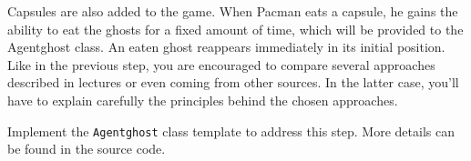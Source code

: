 \documentclass[12pt,a4paper,BCOR12mm, headexclude, footexclude, twoside, openright]{scrartcl}
\numberwithin{equation}{section} %
\numberwithin{figure}{section} %
\numberwithin{table}{section} %
\begin{document}
Capsules are also added to the game. When Pacman eats a capsule, he gains the ability to eat the ghosts for a fixed amount of time, which will be provided to the Agentghost class. An eaten ghost reappears immediately in its initial position.\\

Like in the previous step, you are encouraged to compare several approaches described in lectures or even coming from other sources. In the latter case, you'll have to explain carefully the principles behind the chosen approaches.

Implement the \texttt{Agentghost} class template to address this step. More details can be found in the source code.
\end{document}
